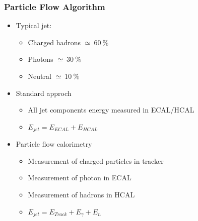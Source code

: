 \documentclass{beamer}
\begin{document}
  \begin{frame}[plain]
    \frametitle{Particle Flow Algorithm}

    \begin{itemize}
      \item Typical jet:
        \begin{itemize}
          \item Charged hadrons $\simeq~60~\%$
          \item Photons $\simeq~30~\%$
          \item Neutral $\simeq~10~\%$
        \end{itemize}
      \item Standard approch
        \begin{itemize}
          \item All jet components energy measured in ECAL/HCAL
          \item $E_{jet} = E_{ECAL} + E_{HCAL}$
        \end{itemize}
      \item Particle flow calorimetry
        \begin{itemize}
          \item Measurement of charged particles in tracker
          \item Measurement of photon in ECAL
          \item Measurement of hadrons in HCAL
          \item $E_{jet} = E_{Track} + E_{\gamma} + E_n$
        \end{itemize}
    \end{itemize}
  \end{frame}
\end{document}
